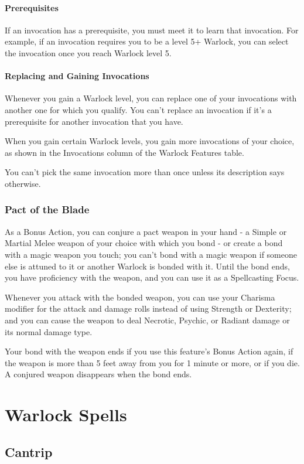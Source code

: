 \documentclass[letterpaper,openany,oneside,twocolumn]{book}
\begin{document}
\paragraph*{Prerequisites} If an invocation has a prerequisite, you must meet it to learn that invocation. For example, if an invocation requires you to be a level 5+ Warlock, you can select the invocation once you reach Warlock level 5.

\paragraph*{Replacing and Gaining Invocations} Whenever you gain a Warlock level, you can replace one of your invocations with another one for which you qualify. You can't replace an invocation if it's a prerequisite for another invocation that you have.

When you gain certain Warlock levels, you gain more invocations of your choice, as shown in the Invocations column of the Warlock Features table.

You can't pick the same invocation more than once unless its description says otherwise.
\subsubsection*{Pact of the Blade}
As a Bonus Action, you can conjure a pact weapon in your hand - a Simple or Martial Melee weapon of your choice with which you bond - or create a bond with a magic weapon you touch; you can't bond with a magic weapon if someone else is attuned to it or another Warlock is bonded with it. Until the bond ends, you have proficiency with the weapon, and you can use it as a Spellcasting Focus.

Whenever you attack with the bonded weapon, you can use your Charisma modifier for the attack and damage rolls instead of using Strength or Dexterity; and you can cause the weapon to deal Necrotic, Psychic, or Radiant damage or its normal damage type.

Your bond with the weapon ends if you use this feature's Bonus Action again, if the weapon is more than 5 feet away from you for 1 minute or more, or if you die. A conjured weapon disappears when the bond ends.

\section*{Warlock Spells}
\subsection*{Cantrip}
\end{document}
